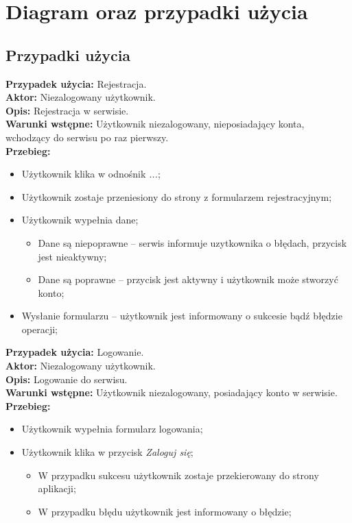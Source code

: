 \section{Diagram oraz przypadki użycia}

\subsection{Przypadki użycia}

\noindent
\textbf{Przypadek użycia:} Rejestracja. \\
\textbf{Aktor:} Niezalogowany użytkownik. \\
\textbf{Opis:} Rejestracja w serwisie. \\
\textbf{Warunki wstępne:} Użytkownik niezalogowany, nieposiadający konta, wchodzący do serwisu po raz pierwszy.\\
\textbf{Przebieg:}
\begin{itemize}
    \item Użytkownik klika w odnośnik \textit{...};
    \item Użytkownik zostaje przeniesiony do strony z formularzem rejestracyjnym;
    \item  Użytkownik wypełnia dane;
    \begin{itemize}
        \item Dane są niepoprawne -- serwis informuje uzytkownika o błędach, przycisk jest nieaktywny;
        \item Dane są poprawne -- przycisk jest aktywny i użytkownik może stworzyć konto;
    \end{itemize}
    \item Wysłanie formularzu -- użytkownik jest informowany o sukcesie bądź błędzie operacji;
\end{itemize}

\textbf{Przypadek użycia:} Logowanie. \\
\textbf{Aktor:} Niezalogowany użytkownik. \\
\textbf{Opis:} Logowanie do serwisu. \\
\textbf{Warunki wstępne:} Użytkownik niezalogowany, posiadający konto w serwisie. \\
\textbf{Przebieg:}
\begin{itemize}
    \item Użytkownik wypełnia formularz logowania;
    \item Użytkownik klika w przycisk \textit{Zaloguj się};
    \begin{itemize}
        \item W przypadku sukcesu użytkownik zostaje przekierowany do strony aplikacji;
        \item W przypadku błędu użytkownik jest informowany o błędzie;
    \end{itemize}
\end{itemize}


